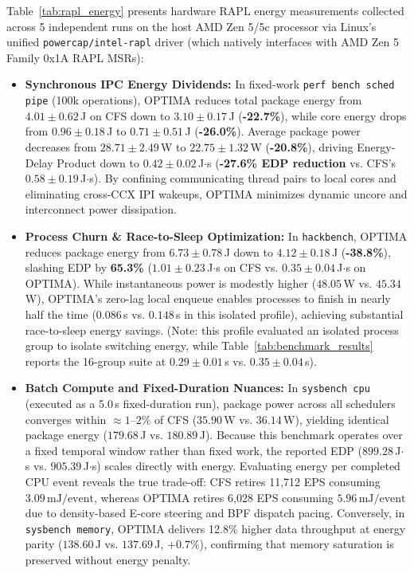 \documentclass[letterpaper,twocolumn,10pt]{article}
\begin{document}
Table~\ref{tab:rapl_energy} presents hardware RAPL energy measurements collected across 5 independent runs on the host AMD Zen 5/5c processor via Linux's unified \texttt{powercap/intel-rapl} driver (which natively interfaces with AMD Zen 5 Family 0x1A RAPL MSRs):
\begin{itemize}\setlength{\itemsep}{0pt}\setlength{\parskip}{0pt}
    \item \textbf{Synchronous IPC Energy Dividends:} In fixed-work \texttt{perf bench sched pipe} (100k operations), OPTIMA reduces total package energy from $4.01 \pm 0.62$\,J on CFS down to $\mathbf{3.10 \pm 0.17}$\,J (\textbf{-22.7\%}), while core energy drops from $0.96 \pm 0.18$\,J to $\mathbf{0.71 \pm 0.51}$\,J (\textbf{-26.0\%}). Average package power decreases from $28.71 \pm 2.49$\,W to $\mathbf{22.75 \pm 1.32}$\,W (\textbf{-20.8\%}), driving Energy-Delay Product down to $\mathbf{0.42 \pm 0.02}$\,J$\cdot$s (\textbf{-27.6\% EDP reduction} vs. CFS's $0.58 \pm 0.19$\,J$\cdot$s). By confining communicating thread pairs to local cores and eliminating cross-CCX IPI wakeups, OPTIMA minimizes dynamic uncore and interconnect power dissipation.
    \item \textbf{Process Churn \& Race-to-Sleep Optimization:} In \texttt{hackbench}, OPTIMA reduces package energy from $6.73 \pm 0.78$\,J down to $\mathbf{4.12 \pm 0.18}$\,J (\textbf{-38.8\%}), slashing EDP by \textbf{65.3\%} ($1.01 \pm 0.23$\,J$\cdot$s on CFS vs. $\mathbf{0.35 \pm 0.04}$\,J$\cdot$s on OPTIMA). While instantaneous power is modestly higher ($48.05$\,W vs. $45.34$\,W), OPTIMA's zero-lag local enqueue enables processes to finish in nearly half the time ($0.086$\,s vs. $0.148$\,s in this isolated profile), achieving substantial race-to-sleep energy savings. (Note: this profile evaluated an isolated process group to isolate switching energy, while Table~\ref{tab:benchmark_results} reports the 16-group suite at $0.29 \pm 0.01$\,s vs. $0.35 \pm 0.04$\,s).
    \item \textbf{Batch Compute and Fixed-Duration Nuances:} In \texttt{sysbench cpu} (executed as a 5.0\,s fixed-duration run), package power across all schedulers converges within $\approx 1\text{--}2\%$ of CFS ($35.90$\,W vs. $36.14$\,W), yielding identical package energy ($179.68$\,J vs. $180.89$\,J). Because this benchmark operates over a fixed temporal window rather than fixed work, the reported EDP ($899.28$\,J$\cdot$s vs. $905.39$\,J$\cdot$s) scales directly with energy. Evaluating energy per completed CPU event reveals the true trade-off: CFS retires 11,712 EPS consuming $3.09\,\text{mJ/event}$, whereas OPTIMA retires 6,028 EPS consuming $5.96\,\text{mJ/event}$ due to density-based E-core steering and BPF dispatch pacing. Conversely, in \texttt{sysbench memory}, OPTIMA delivers 12.8\% higher data throughput at energy parity ($138.60$\,J vs. $137.69$\,J, $+0.7\%$), confirming that memory saturation is preserved without energy penalty.
\end{itemize}
\end{document}
